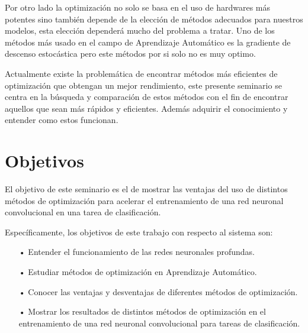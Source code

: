 Por otro lado la optimización no solo se basa en el uso de hardwares más potentes sino también depende de la elección de métodos adecuados para nuestros modelos, esta elección dependerá mucho del problema a tratar. Uno de los métodos más usado en el campo de Aprendizaje Automático es la gradiente de descenso estocástica pero este métodos por si solo no es muy optimo. 

Actualmente existe la problemática de encontrar métodos más eficientes de optimización que obtengan un mejor rendimiento, este presente seminario se centra en la búsqueda y comparación de estos métodos con el fin de encontrar aquellos que sean más rápidos y eficientes. Además adquirir el conocimiento y entender como estos funcionan.


\section{Objetivos}

El objetivo de este seminario es el de mostrar las ventajas del uso de distintos métodos de optimización para acelerar el entrenamiento de una red neuronal convolucional en una tarea de clasificación.

Específicamente, los objetivos de este trabajo con respecto al sistema son:

\begin{itemize}
\item[•] Entender el funcionamiento de las redes neuronales profundas.%

\item[•] Estudiar métodos de optimización en Aprendizaje Automático.

\item[•] Conocer las ventajas y desventajas de diferentes métodos de optimización.
\item[•] Mostrar los resultados de distintos métodos de optimización en el entrenamiento de una red neuronal convolucional para tareas de clasificación.



\end{itemize}

